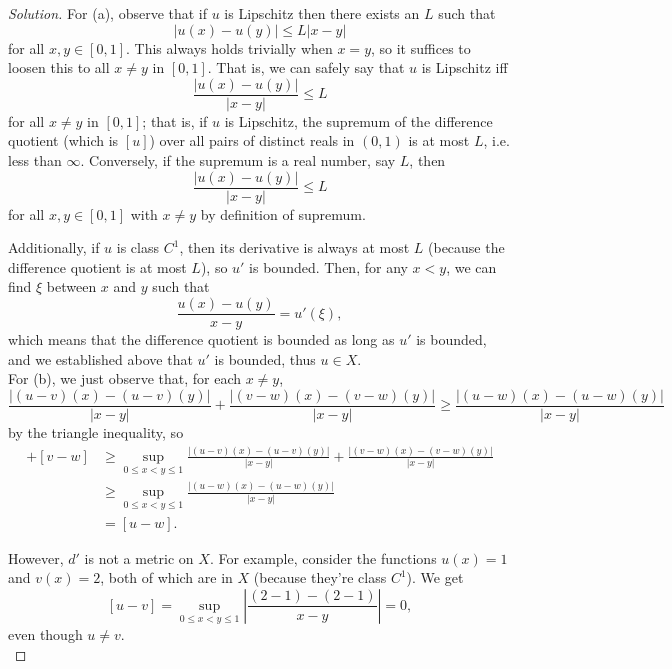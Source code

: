 \documentclass[11pt]{scrartcl}
\providecommand{\abs}[1]{\left|#1\right|}
\newenvironment{soln}{\begin{proof}[Solution]}{\end{proof}}
\begin{document}
\begin{soln}
	For (a), observe that if $u$ is Lipschitz then there exists an $L$ such that
	\[|u(x) - u(y)| \le L|x - y|\]
	for all $x,y\in[0,1]$. This always holds trivially when $x = y$,
	so it suffices to loosen this to all $x\ne y$ in $[0,1]$.
	That is, we can safely say that $u$ is Lipschitz iff
	\[\frac{|u(x) - u(y)|}{|x - y|} \le L\]
	for all $x\ne y$ in $[0,1]$; that is, if $u$ is Lipschitz, the supremum
	of the difference quotient (which is $[u]$) over all
	pairs of distinct reals in $(0,1)$ is at most $L$, i.e. less than $\infty$.
	Conversely, if the supremum is a real number, say $L$, then
	\[\frac{|u(x) - u(y)|}{|x - y|} \le L\]
	for all $x,y\in[0,1]$ with $x\ne y$ by definition of supremum.
	
	Additionally, if $u$ is class $C^1$, then its derivative is
	always at most $L$ (because the difference quotient is at most $L$),
	so $u'$ is bounded. Then, for any $x < y$, we can find
	$\xi$ between $x$ and $y$ such that
	\[\frac{u(x) - u(y)}{x - y} = u'(\xi),\]
	which means that the difference quotient is bounded
	as long as $u'$ is bounded, and we established above that $u'$ is bounded,
	thus $u\in X$.\\
	
	For (b), we just observe that, for each $x\ne y$,
	\[\frac{|(u-v)(x) - (u-v)(y)|}{|x-y|} +
	\frac{|(v-w)(x) - (v-w)(y)|}{|x-y|} \ge
	\frac{|(u-w)(x) - (u-w)(y)|}{|x - y|}\]
	by the triangle inequality, so
	\begin{align*}
		[u-v] + [v-w] &\ge
		\sup_{0\le x<y\le1}\frac{|(u-v)(x) - (u-v)(y)|}{|x-y|} +
		\frac{|(v-w)(x) - (v-w)(y)|}{|x-y|}\\
		&\ge \sup_{0\le x<y\le 1} \frac{|(u-w)(x) - (u-w)(y)|}{|x - y|}\\
		&= [u-w].
	\end{align*}
	
	However, $d'$ is not a metric on $X$. For example, consider the functions
	$u(x) = 1$ and $v(x) = 2$, both of which are in $X$
	(because they're class $C^1$). We get
	\[[u-v] = \sup_{0\le x<y\le 1} \abs{\frac{(2-1) - (2-1)}{x - y}} = 0,\]
	even though $u\ne v$.\\
	

\end{soln}
\end{document}
